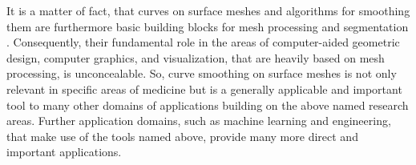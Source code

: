 \documentclass{stdlocal}
\begin{document}
  It is a matter of fact, that curves on surface meshes and algorithms for smoothing them are furthermore basic building blocks for mesh processing and segmentation \autocite{ji2006,kaplansky2009}.
  Consequently, their fundamental role in the areas of computer-aided geometric design, computer graphics, and visualization, that are heavily based on mesh processing, is unconcealable.
  So, curve smoothing on surface meshes is not only relevant in specific areas of medicine but is a generally applicable and important tool to many other domains of applications building on the above named research areas.
  Further application domains, such as machine learning \autocite{benhabiles2011,park2019} and engineering, that make use of the tools named above, provide many more direct and important applications.

\end{document}
